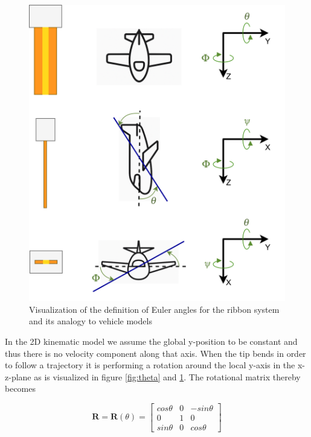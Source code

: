 \begin{figure} [H]
    \centering
    \includegraphics[width=0.7\linewidth]{images/planes.png}
    \caption{Visualization of the definition of Euler angles for the ribbon system and its analogy to vehicle models}
    \label{fig:planes}
\end{figure}



In the 2D kinematic model we assume the global y-position to be constant and thus there is no velocity component along that axis. When the tip bends in order to follow a trajectory it is performing a rotation around the local y-axis in the x-z-plane as is visualized in figure \ref{fig:theta} and \ref{fig:planes}. The rotational matrix thereby becomes

\begin{equation}
    \textbf{R} = \textbf{R}(\theta) = \begin{bmatrix}
        cos \theta   &   0   &   -sin \theta \\
        0            &   1   &   0\\
        sin \theta   &   0   &   cos \theta
    \end{bmatrix}
\end{equation}

